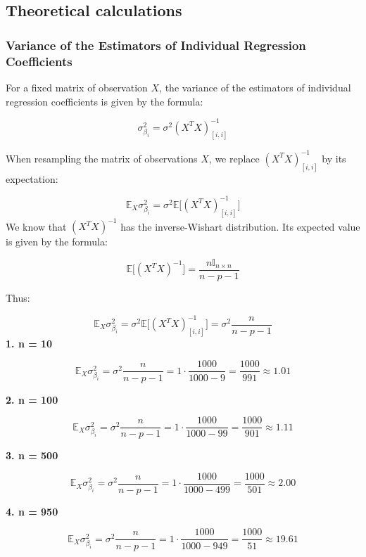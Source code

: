 \documentclass[
]{article}
\begin{document}
\hypertarget{theoretical-calculations}{%
\subsection{Theoretical calculations}\label{theoretical-calculations}}

\hypertarget{variance-of-the-estimators-of-individual-regression-coefficients}{%
\subsubsection{Variance of the Estimators of Individual Regression
Coefficients}\label{variance-of-the-estimators-of-individual-regression-coefficients}}

For a fixed matrix of observation \(X\), the variance of the estimators
of individual regression coefficients is given by the formula:

\[\sigma_{\beta_i}^2 = \sigma^2(X^TX)^{-1}_{[i, i]}\]

When resampling the matrix of observations \(X\), we replace
\((X^TX)^{-1}_{[i, i]}\) by its expectation:

\[\mathbb E_X \sigma_{\beta_i}^2 = \sigma^2\mathbb E \Big[(X^TX)^{-1}_{[i, i]}\Big]\]
We know that \((X^TX)^{-1}\) has the inverse-Wishart distribution. Its
expected value is given by the formula:

\[\mathbb E \big[ (X^TX)^{-1} \big]= \frac {n \mathbb I_{n \times n}}{n - p - 1}\]

Thus:

\[\mathbb E_X \sigma_{\beta_i}^2 = \sigma^2\mathbb E \Big[(X^TX)^{-1}_{[i, i]}\Big] = \sigma^2 \frac {n}{n-p-1}\]
\textbf{1. n = 10}

\[\mathbb E_X \sigma_{\beta_i}^2 = \sigma^2 \frac {n}{n-p-1} = 1 \cdot \frac {1000} {1000 - 9} = \frac {1000}{991} \approx 1.01\]

\textbf{2. n = 100}

\[\mathbb E_X \sigma_{\beta_i}^2 = \sigma^2 \frac {n}{n-p-1} = 1 \cdot \frac {1000} {1000 - 99} = \frac{1000}{901} \approx 1.11\]

\textbf{3. n = 500}

\[\mathbb E_X \sigma_{\beta_i}^2 = \sigma^2 \frac {n}{n-p-1} = 1 \cdot \frac {1000} {1000 - 499} = \frac {1000} {501} \approx 2.00\]

\textbf{4. n = 950}

\[\mathbb E_X \sigma_{\beta_i}^2 = \sigma^2 \frac {n}{n-p-1} = 1 \cdot \frac {1000} {1000 - 949} = \frac {1000}{51} \approx 19.61\]
\end{document}
